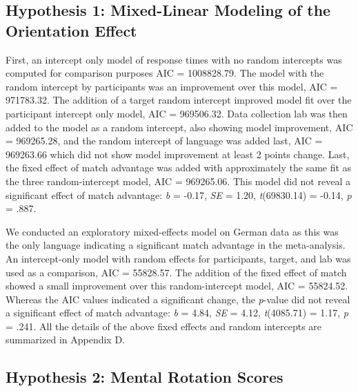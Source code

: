 \documentclass[
  man,floatsintext]{apa7}
\begin{document}
\hypertarget{hypothesis-1-mixed-linear-modeling-of-the-orientation-effect}{%
\subsection{Hypothesis 1: Mixed-Linear Modeling of the Orientation Effect}\label{hypothesis-1-mixed-linear-modeling-of-the-orientation-effect}}

First, an intercept only model of response times with no random
intercepts was computed for comparison purposes AIC =
1008828.79. The
model with the random intercept by participants was an improvement over
this model, AIC =
971783.32. The
addition of a target random intercept improved model fit over the
participant intercept only model, AIC =
969506.32. Data
collection lab was then added to the model as a random intercept, also
showing model improvement, AIC =
969265.28, and the
random intercept of language was added last, AIC =
969263.66 which did
not show model improvement at least 2 points change. Last, the fixed
effect of match advantage was added with approximately the same fit as
the three random-intercept model, AIC =
969265.06. This model
did not reveal a significant effect of match advantage: \emph{b} =
-0.17, \emph{SE} =
1.20,
\emph{t}(69830.14) =
-0.14, \emph{p} =
.887.

We conducted an exploratory mixed-effects model on German data as this
was the only language indicating a significant match advantage in the
meta-analysis. An intercept-only model with random effects for
participants, target, and lab was used as a comparison, AIC =
55828.57. The
addition of the fixed effect of match showed a small improvement over
this random-intercept model, AIC =
55824.52.
Whereas the AIC values indicated a significant change, the \emph{p}-value did
not reveal a significant effect of match advantage: \emph{b} =
4.84, \emph{SE} =
4.12,
\emph{t}(4085.71) =
1.17, \emph{p} =
.241. All the details of the above fixed
effects and random intercepts are summarized in Appendix D.

\hypertarget{hypothesis-2-mental-rotation-scores}{%
\subsection{Hypothesis 2: Mental Rotation Scores}\label{hypothesis-2-mental-rotation-scores}}
\end{document}
